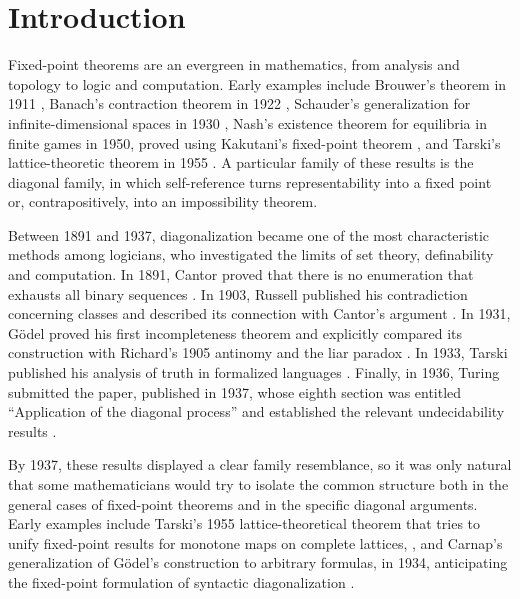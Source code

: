 \chapter*{Introduction}
\vspace{-2\baselineskip}

Fixed-point theorems are an evergreen in mathematics, from analysis and topology to logic and computation.
Early examples include Brouwer's theorem in 1911 \parencite{Brouwer1911}, Banach's contraction theorem in 1922
\parencite{Banach1922}, Schauder's generalization for infinite-dimensional spaces in 1930 \parencite{Schauder1930}, Nash's existence theorem for equilibria in finite games in 1950, proved using Kakutani's fixed-point theorem \parencite{Nash1950}, and Tarski's lattice-theoretic theorem in 1955 \parencite{Tarski1955}.
A particular family of these results is the diagonal family, in which self-reference turns representability into a fixed point or, contrapositively, into an impossibility theorem.

Between 1891 and 1937, diagonalization became one of the most characteristic methods among logicians, who investigated the limits of set theory, definability and computation.
In 1891, Cantor proved that there is no enumeration that exhausts all binary sequences \parencite{Cantor1891}.
In 1903, Russell published his contradiction concerning classes and described its connection with Cantor's argument \parencite{Russell1903}.
In 1931, Gödel proved his first incompleteness theorem and explicitly compared its construction with Richard's 1905 antinomy and the liar paradox \parencite{Godel1931}. In 1933, Tarski published his analysis of truth in formalized languages \parencite{Tarski1933}.
Finally, in 1936, Turing submitted the paper, published in 1937, whose eighth section was entitled ``Application of the diagonal process'' and established the relevant undecidability results \parencite{Turing1937}.

By 1937, these results displayed a clear family resemblance, so it was only natural that some mathematicians would try to isolate the common structure
both in the general cases of fixed-point theorems and in the specific diagonal arguments. Early examples include
Tarski's 1955 lattice-theoretical theorem that tries to unify fixed-point results for monotone maps on complete lattices, \parencite{Tarski1955},
and Carnap's generalization of Gödel's construction to arbitrary formulas, in 1934, anticipating the fixed-point formulation of syntactic diagonalization \parencite{Carnap1934}.

